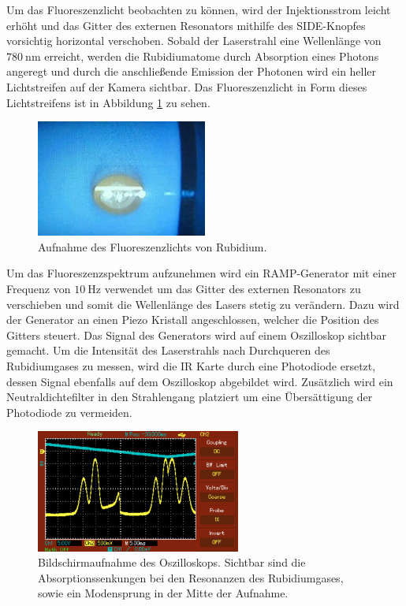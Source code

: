 Um das Fluoreszenzlicht beobachten zu können, wird der Injektionsstrom leicht erhöht und das Gitter des externen Resonators mithilfe des SIDE-Knopfes vorsichtig horizontal verschoben.
Sobald der Laserstrahl eine Wellenlänge von $\SI{780}{\nm}$ erreicht, werden die Rubidiumatome durch Absorption eines Photons angeregt und durch die anschließende Emission der Photonen wird ein heller Lichtstreifen auf der Kamera sichtbar.
Das Fluoreszenzlicht in Form dieses Lichtstreifens ist in Abbildung \ref{abb:afig4} zu sehen.

\begin{figure}
    \centering
    \includegraphics[width=0.5\textwidth]{pics/fluor}
    \caption{Aufnahme des Fluoreszenzlichts von Rubidium.}
    \label{abb:afig4}
\end{figure}

Um das Fluoreszenzspektrum aufzunehmen wird ein RAMP-Generator mit einer Frequenz von $\SI{10}{\Hz}$ verwendet um das Gitter des externen Resonators zu verschieben und somit die Wellenlänge des Lasers stetig zu verändern.
Dazu wird der Generator an einen Piezo Kristall angeschlossen, welcher die Position des Gitters steuert.
Das Signal des Generators wird auf einem Oszilloskop sichtbar gemacht.
Um die Intensität des Laserstrahls nach Durchqueren des Rubidiumgases zu messen, wird die IR Karte durch eine Photodiode ersetzt, dessen Signal ebenfalls auf dem Oszilloskop abgebildet wird.
Zusätzlich wird ein Neutraldichtefilter in den Strahlengang platziert um eine Übersättigung der Photodiode zu vermeiden.

\begin{figure}
    \centering
    \includegraphics[width=0.6\textwidth]{data/rub1}
    \caption{Bildschirmaufnahme des Oszilloskops. Sichtbar sind die Absorptionssenkungen bei den Resonanzen des Rubidiumgases, sowie ein Modensprung in der Mitte der Aufnahme.}
    \label{abb:afig5}
\end{figure}

